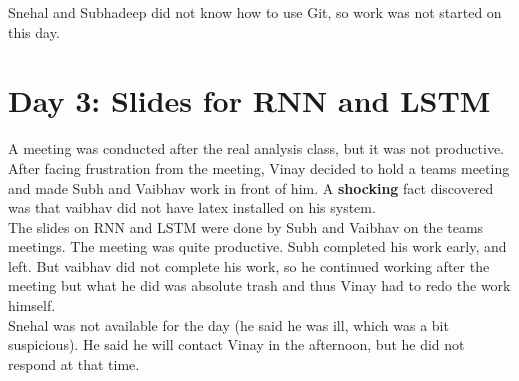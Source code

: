 \documentclass[11pt]{scrartcl}
\begin{document}
Snehal and Subhadeep did not know how to use Git, so work was not started on this day.

\section{Day 3: Slides for RNN and LSTM}
A meeting was conducted after the real analysis class, but it was not productive. \\

After facing frustration from the meeting, Vinay decided to hold a teams meeting and made Subh and Vaibhav work in front of him. A \textbf{shocking} fact discovered was that vaibhav did not have latex installed on his system. \\

The slides on RNN and LSTM were done by Subh and Vaibhav on the teams meetings. The meeting was quite productive. Subh completed his work early, and left. But vaibhav did not complete his work, so he continued working after the meeting but what he did was absolute trash and thus Vinay had to redo the work himself.\\

Snehal was not available for the day (he said he was ill, which was a bit suspicious). He said he will contact Vinay in the afternoon, but he did not respond at that time.
\end{document}
